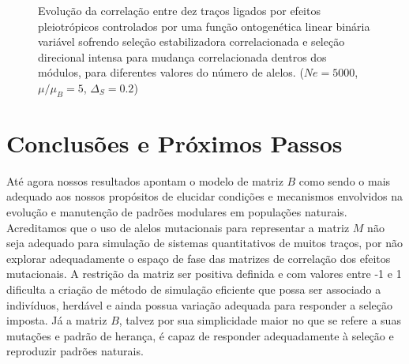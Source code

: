 \documentclass[a4paper, 12pt, titlepage, onecolumn]{article}
\numberwithin{equation}{section}
\numberwithin{table}{section}
\begin{document}
\begin{center}
\begin{figure}[H]
\end{figure}
\begin{figure}[H]
  \caption{Evolução da correlação entre dez traços ligados por efeitos
  pleiotrópicos controlados por uma função ontogenética linear binária
  variável sofrendo seleção estabilizadora correlacionada e seleção
  direcional intensa para mudança correlacionada dentros dos módulos,
  para diferentes valores do número de alelos. ($Ne=5000$, $\mu/\mu_B=5$, $\Delta_S=0.2$)}
  \label{MBLR}
\end{figure}
\end{center}

\section{Conclusões e Próximos Passos}

Até agora nossos resultados apontam o modelo de matriz $B$ como sendo o
mais adequado aos nossos propósitos de elucidar condições e mecanismos
envolvidos na evolução e manutenção de padrões modulares em populações
naturais. Acreditamos que o uso de alelos mutacionais para representar a
matriz $M$ não seja adequado para simulação de sistemas quantitativos de
muitos traços, por não explorar adequadamente o espaço de fase das
matrizes de correlação dos efeitos mutacionais. A restrição da matriz
ser positiva definida e com valores entre -1 e 1 dificulta a criação de
método de simulação eficiente que possa ser associado a indivíduos,
herdável e ainda possua variação adequada para responder a seleção
imposta. Já a matriz $B$, talvez por sua simplicidade maior no que se
refere a suas mutações e padrão de herança, é capaz de responder
adequadamente à seleção e reproduzir padrões naturais.
\end{document}
